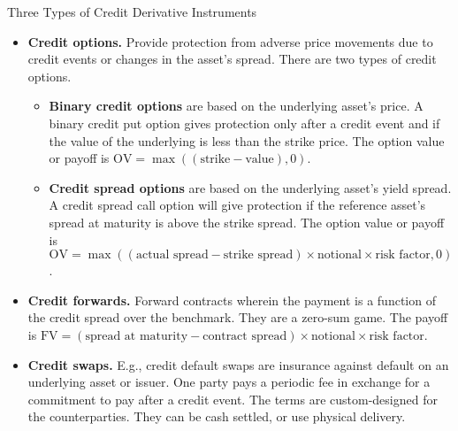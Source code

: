 \documentclass[../custom]{flashcards}
\begin{document}
\begin{flashcard}{Three Types of Credit Derivative Instruments}
    \begin{itemize}
        \item \textbf{Credit options.} Provide protection from adverse price movements due to credit events or changes in the asset's spread. There are two types of credit options.
            \begin{itemize}
                \item \textbf{Binary credit options} are based on the underlying asset's price. A binary credit put option gives protection only after a credit event and if the value of the underlying is less than the strike price. The option value or payoff is $\text{OV} = \max ((\text{strike} - \text{value}), 0)$.
                \item \textbf{Credit spread options} are based on the underlying asset's yield spread. A credit spread call option will give protection if the reference asset's spread at maturity is above the strike spread. The option value or payoff is $\text{OV} = \max ((\text{actual spread} - \text{strike spread}) \times \text{notional} \times \text{risk factor}, 0)$.
            \end{itemize}
        \item \textbf{Credit forwards.} Forward contracts wherein the payment is a function of the credit spread over the benchmark. They are a zero-sum game. The payoff is $\text{FV} = (\text{spread at maturity} - \text{contract spread}) \times \text{notional} \times \text{risk factor}$.
        \item \textbf{Credit swaps.} E.g., credit default swaps are insurance against default on an underlying asset or issuer. One party pays a periodic fee in exchange for a commitment to pay after a credit event. The terms are custom-designed for the counterparties. They can be cash settled, or use physical delivery.
    \end{itemize}
\end{flashcard}
\end{document}
